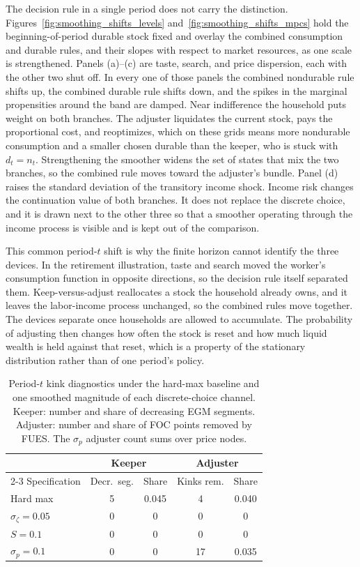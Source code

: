 The decision rule in a single period does not carry the distinction. Figures~\ref{fig:smoothing_shifts_levels} and~\ref{fig:smoothing_shifts_mpcs} hold the beginning-of-period durable stock fixed and overlay the combined consumption and durable rules, and their slopes with respect to market resources, as one scale is strengthened. Panels (a)--(c) are taste, search, and price dispersion, each with the other two shut off. In every one of those panels the combined nondurable rule shifts up, the combined durable rule shifts down, and the spikes in the marginal propensities around the band are damped. Near indifference the household puts weight on both branches. The adjuster liquidates the current stock, pays the proportional cost, and reoptimizes, which on these grids means more nondurable consumption and a smaller chosen durable than the keeper, who is stuck with $d_t = n_t$. Strengthening the smoother widens the set of states that mix the two branches, so the combined rule moves toward the adjuster's bundle. Panel (d) raises the standard deviation of the transitory income shock. Income risk changes the continuation value of both branches. It does not replace the discrete choice, and it is drawn next to the other three so that a smoother operating through the income process is visible and is kept out of the comparison.

This common period-$t$ shift is why the finite horizon cannot identify the three devices. In the retirement illustration, taste and search moved the worker's consumption function in opposite directions, so the decision rule itself separated them. Keep-versus-adjust reallocates a stock the household already owns, and it leaves the labor-income process unchanged, so the combined rules move together. The devices separate once households are allowed to accumulate. The probability of adjusting then changes how often the stock is reset and how much liquid wealth is held against that reset, which is a property of the stationary distribution rather than of one period's policy.

\begin{table}[htbp]
\centering
\caption{Period-$t$ kink diagnostics under the hard-max baseline and one smoothed magnitude of each discrete-choice channel. Keeper: number and share of decreasing EGM segments. Adjuster: number and share of FOC points removed by FUES. The $\sigma_p$ adjuster count sums over price nodes.}
\label{tab:smoothing_kinks}
\begin{tabular}{lcccc}
\hline
 & \multicolumn{2}{c}{Keeper} & \multicolumn{2}{c}{Adjuster} \\
\cline{2-3}\cline{4-5}
Specification & Decr.\ seg. & Share & Kinks rem. & Share \\
\hline
Hard max & 5 & 0.045 & 4 & 0.040 \\
$\sigma_\zeta = 0.05$ & 0 & 0 & 0 & 0 \\
$S = 0.1$ & 0 & 0 & 0 & 0 \\
$\sigma_p = 0.1$ & 0 & 0 & 17 & 0.035 \\
\hline
\end{tabular}
\end{table}

